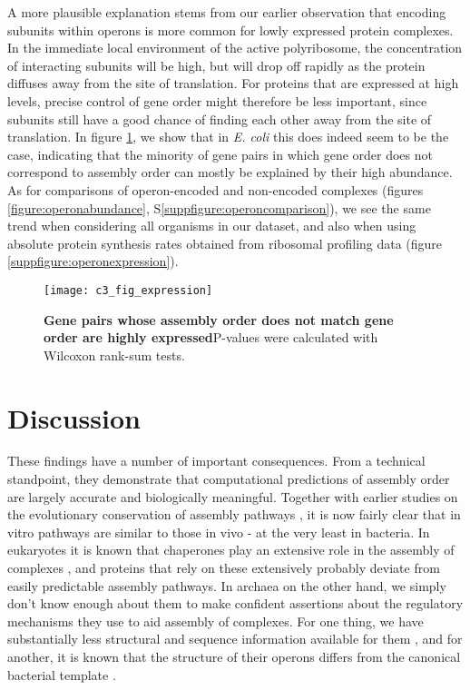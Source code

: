 \documentclass[a4paper,11pt,twoside,openright]{scrbook}
\begin{document}
A more plausible explanation stems from our earlier observation that encoding subunits within operons is more common for lowly expressed protein complexes. In the immediate local environment of the active polyribosome, the concentration of interacting subunits will be high, but will drop off rapidly as the protein diffuses away from the site of translation. For proteins that are expressed at high levels, precise control of gene order might therefore be less important, since subunits still have a good chance of finding each other away from the site of translation. In figure \ref{figure:operonexpression}, we show that in \textit{E. coli} this does indeed seem to be the case, indicating that the minority of gene pairs in which gene order does not correspond to assembly order can mostly be explained by their high abundance. As for comparisons of operon-encoded and non-encoded complexes (figures \ref{figure:operonabundance}, S\ref{suppfigure:operoncomparison}), we see the same trend when considering all organisms in our dataset, and also when using absolute protein synthesis rates obtained from ribosomal profiling data (figure \ref{suppfigure:operonexpression}).

\begin{figure}[h]
\fcapsideright
    {\caption[Gene pairs whose assembly order does not match gene order are highly expressed]{\sffamily\textbf{Gene pairs whose assembly order does not match gene order are highly expressed}\newline \small P-values were calculated with Wilcoxon rank-sum tests.}\label{figure:operonexpression}}
    {\texttt{[image: c3\_fig\_expression]}}
\end{figure}

\section{Discussion}
These findings have a number of important consequences. From a technical standpoint, they demonstrate that computational predictions of assembly order are largely accurate and biologically meaningful. Together with earlier studies on the evolutionary conservation of assembly pathways \cite{Levy2008,Marsh2013}, it is now fairly clear that in vitro pathways are similar to those in vivo - at the very least in bacteria. In eukaryotes it is known that chaperones play an extensive role in the assembly of complexes \cite{Ellis2006}, and proteins that rely on these extensively probably deviate from easily predictable assembly pathways. In archaea on the other hand, we simply don't know enough about them to make confident assertions about the regulatory mechanisms they use to aid assembly of complexes. For one thing, we have substantially less structural and sequence information available for them \cite{Mukherjee2017}, and for another, it is known that the structure of their operons differs from the canonical bacterial template \cite{Koide2009}.
\end{document}
